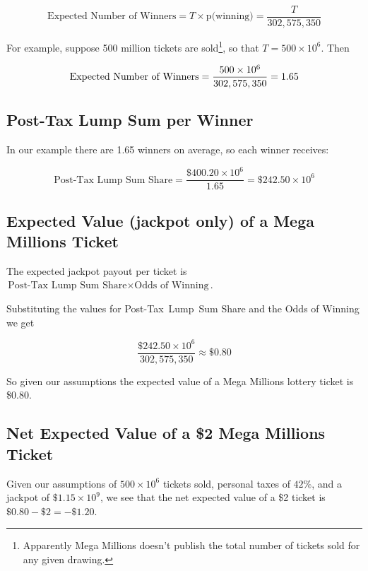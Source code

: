 \documentclass{article}
\theoremstyle{definition}
\begin{document}
\begin{equation*}
\text{Expected Number of Winners} = T \times \text{p(winning)} = \dfrac{T}{302,575,350}
\end{equation*}

\bigskip
\noindent
For example, suppose 500 million tickets are
sold\footnote{Apparently Mega Millions doesn't publish the total
number of tickets sold for any given drawing.}, so that $T = 500
\times 10^6$. Then 


\medskip
\begin{equation*}
\text{Expected Number of Winners} = \dfrac{500\times 10^6}{302,575,350} = 1.65
\vspace{3.25 cm}
\end{equation*}


\subsection{Post-Tax Lump Sum per Winner}
In our example there are 1.65 winners on average, so each winner receives:

\medskip
\begin{equation*}
\text{Post-Tax Lump Sum Share} = \dfrac{\$400.20 \times 10^6}{1.65} = \$242.50 \times 10^6
\end{equation*}


\subsection{Expected Value (jackpot only) of a Mega Millions Ticket}
The expected jackpot payout per ticket is $\text{Post-Tax Lump Sum Share} 
\times \text{Odds of Winning}$.


\bigskip
\noindent
Substituting the values for Post-Tax Lump Sum Share and the 
Odds of Winning we get

\medskip
\begin{equation*}
\dfrac{\$242.50 \times 10^6}{302,575,350} \approx \$0.80
\end{equation*}

\bigskip
\noindent
So given our assumptions the expected value of a Mega Millions 
lottery ticket is \$0.80.

\smallskip
\subsection{Net Expected Value of a \$2 Mega Millions Ticket}
Given our assumptions of $500 \times 10^6$ tickets sold, personal
taxes of $42\%$, and a jackpot of $\$1.15 \times 10^9$, we see
that the net expected value of a \$2 ticket is $\$0.80 - \$2 = -\$1.20$.
%
%
%
\end{document}
